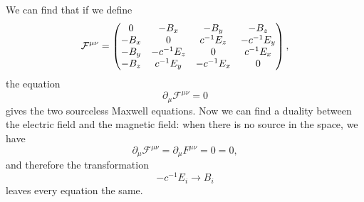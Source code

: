 \documentclass[hyperref, a4paper]{article}
\begin{document}
We can find that if we define 
\begin{equation}
    \mathcal{F}^{\mu \nu} = \pmqty{ 0 & -B_x & -B_y & -B_z \\
     - B_x & 0 & c^{-1} E_z & - c^{-1} E_y \\
     - B_y & - c^{-1} E_z & 0 & c^{-1} E_x \\
     - B_z & c^{-1} E_y & - c^{-1} E_x & 0},
\end{equation}
the equation 
\begin{equation}
    \partial_\mu \mathcal{F}^{\mu \nu} = 0
\end{equation}
gives the two sourceless Maxwell equations. Now we can find a duality between the electric field and the magnetic
field: when there is no source in the space, we have 
\[
    \partial_\mu \mathcal{F}^{\mu \nu} = \partial_\mu {F}^{\mu \nu} = 0 = 0,
\]
and therefore the transformation 
\begin{equation}
    - c^{-1} E_i \longrightarrow B_i
\end{equation}
leaves every equation the same.
\end{document}
